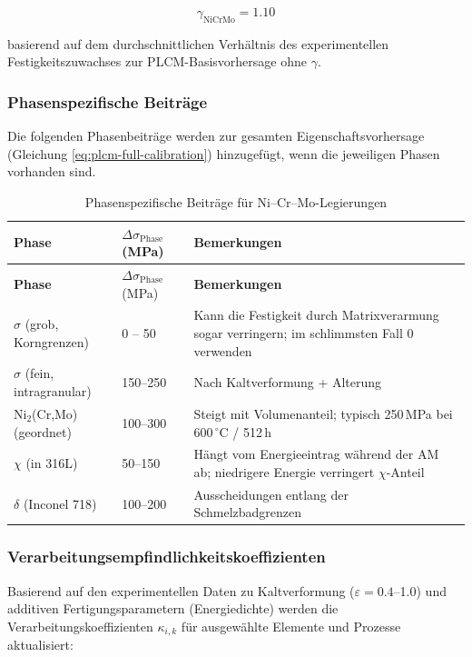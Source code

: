\documentclass[12pt,a4paper]{article}
\begin{document}
	\[
	\gamma_{\text{NiCrMo}} = 1.10
	\]
	
	basierend auf dem durchschnittlichen Verhältnis des experimentellen Festigkeitszuwachses zur PLCM-Basisvorhersage ohne $\gamma$.
	
	\subsubsection{Phasenspezifische Beiträge}
	Die folgenden Phasenbeiträge werden zur gesamten Eigenschaftsvorhersage (Gleichung \ref{eq:plcm-full-calibration}) hinzugefügt, wenn die jeweiligen Phasen vorhanden sind.
	
	\begin{longtable}{p{3.5cm} p{3.0cm} p{4.0cm}}
		\caption{Phasenspezifische Beiträge für Ni–Cr–Mo-Legierungen}\label{tab:nicrmo_phase_contrib}\\
		\toprule
		\textbf{Phase} & \(\Delta\sigma_{\text{Phase}}\) (MPa) & \textbf{Bemerkungen} \\
		\midrule
		\endfirsthead
		\toprule
		\textbf{Phase} & \(\Delta\sigma_{\text{Phase}}\) (MPa) & \textbf{Bemerkungen} \\
		\midrule
		\endhead
		\(\sigma\) (grob, Korngrenzen) & 0 – 50 & Kann die Festigkeit durch Matrixverarmung sogar verringern; im schlimmsten Fall 0 verwenden \\
		\(\sigma\) (fein, intragranular) & 150–250 & Nach Kaltverformung + Alterung \\
		Ni$_2$(Cr,Mo) (geordnet) & 100–300 & Steigt mit Volumenanteil; typisch 250\,MPa bei 600\,\(^{\circ}\)C / 512\,h \\
		\(\chi\) (in 316L) & 50–150 & Hängt vom Energieeintrag während der AM ab; niedrigere Energie verringert \(\chi\)-Anteil \\
		\(\delta\) (Inconel 718) & 100–200 & Ausscheidungen entlang der Schmelzbadgrenzen \\
		\bottomrule
	\end{longtable}
	
	\subsubsection{Verarbeitungsempfindlichkeitskoeffizienten}
	Basierend auf den experimentellen Daten zu Kaltverformung ($\varepsilon=0.4$–1.0) und additiven Fertigungsparametern (Energiedichte) werden die Verarbeitungskoeffizienten $\kappa_{i,k}$ für ausgewählte Elemente und Prozesse aktualisiert:
	
\end{document}
